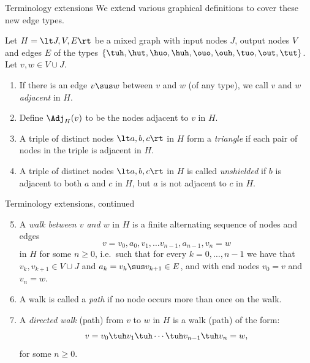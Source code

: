 \begin{frame}[t]{Terminology extensions}
We extend various graphical definitions to cover these new edge types.
  \begin{Def}[\ref{def:more_walks}]
  Let $H=\lt J,V,E \rt$ be a mixed graph with input nodes $J$, output nodes $V$ and edges $E$ of the types $\{\tuh,\hut,\huo,\huh,\ouo,\ouh,\tuo,\out,\tut\}$.\\
  Let $v,w \in V \cup J$.
  \begin{enumerate}
    \item If there is an edge $v \sus w$ between $v$ and $w$ (of any type), we call $v$ and $w$ \emph{adjacent} in $H$.
    \item Define $\Adj_H(v)$ to be the nodes adjacent to $v$ in $H$.
    \item A triple of distinct nodes $\lt a,b,c \rt$ in $H$ form a \emph{triangle} if each pair of nodes in the triple is adjacent in $H$.
    \item A triple of distinct nodes $\lt a,b,c \rt$ in $H$ is called \emph{unshielded} if $b$ is adjacent to both $a$ and $c$ in $H$, but $a$ is not adjacent to $c$ in $H$.
  \end{enumerate}
  \end{Def}
\end{frame}

\begin{frame}[t]{Terminology extensions, continued}
  \begin{Def}
  \begin{enumerate}
    \setcounter{enumi}{4}
    \item A \emph{walk between $v$ and $w$} in $H$ is a finite alternating sequence of nodes and edges 
        \[v=v_0, a_0, v_1, \dots v_{n-1}, a_{n-1}, v_n=w\] 
        in $H$ for some $n \ge 0$, i.e.\ such that for every $k=0,\dots,n-1$ 
        we have that $v_{k},v_{k+1} \in V \cup J$ and $a_k = v_k \sus v_{k+1} \in E$, and with end nodes $v_0=v$ and $v_n=w$.
    \item A walk is called a \emph{path} if no node occurs more than once on the walk.
    \item A \emph{directed walk} (path) from $v$ to $w$ in $H$ is a walk (path) of the form:
        \[v=v_0 \tuh v_1 \tuh  \cdots \tuh v_{n-1} \tuh v_n=w,\]
        for some $n \ge 0$.
  \end{enumerate}
  \end{Def}
\end{frame}

